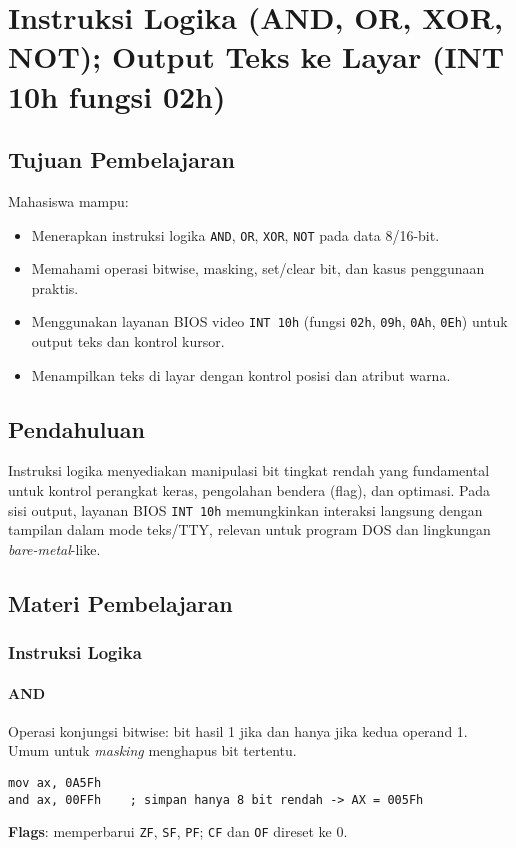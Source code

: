 \chapter{Instruksi Logika (AND, OR, XOR, NOT); Output Teks ke Layar (INT 10h fungsi 02h)}

\section{Tujuan Pembelajaran}
Mahasiswa mampu:
\begin{itemize}
  \item Menerapkan instruksi logika \texttt{AND}, \texttt{OR}, \texttt{XOR}, \texttt{NOT} pada data 8/16-bit.
  \item Memahami operasi bitwise, masking, set/clear bit, dan kasus penggunaan praktis.
  \item Menggunakan layanan BIOS video \texttt{INT 10h} (fungsi \texttt{02h}, \texttt{09h}, \texttt{0Ah}, \texttt{0Eh}) untuk output teks dan kontrol kursor.
  \item Menampilkan teks di layar dengan kontrol posisi dan atribut warna.
\end{itemize}

\section{Pendahuluan}
Instruksi logika menyediakan manipulasi bit tingkat rendah yang fundamental untuk kontrol perangkat keras, pengolahan bendera (flag), dan optimasi. Pada sisi output, layanan BIOS \texttt{INT 10h} memungkinkan interaksi langsung dengan tampilan dalam mode teks/TTY, relevan untuk program DOS dan lingkungan \textit{bare-metal}-like.

\section{Materi Pembelajaran}
\subsection{Instruksi Logika}
\subsubsection{AND}
Operasi konjungsi bitwise: bit hasil 1 jika dan hanya jika kedua operand 1. Umum untuk \textit{masking} menghapus bit tertentu.
\begin{verbatim}
mov ax, 0A5Fh
and ax, 00FFh    ; simpan hanya 8 bit rendah -> AX = 005Fh
\end{verbatim}
\textbf{Flags}: memperbarui \texttt{ZF}, \texttt{SF}, \texttt{PF}; \texttt{CF} dan \texttt{OF} direset ke 0.

